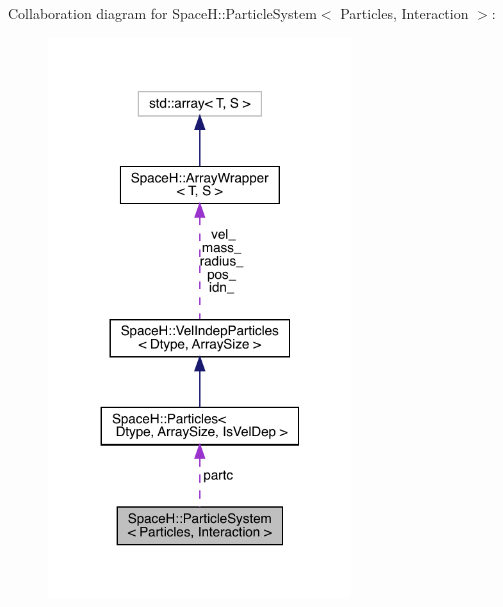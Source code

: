 Collaboration diagram for SpaceH\+:\+:Particle\+System$<$ Particles, Interaction $>$\+:
\nopagebreak
\begin{figure}[H]
\begin{center}
\leavevmode
\includegraphics[width=227pt]{class_space_h_1_1_particle_system__coll__graph}
\end{center}
\end{figure}
